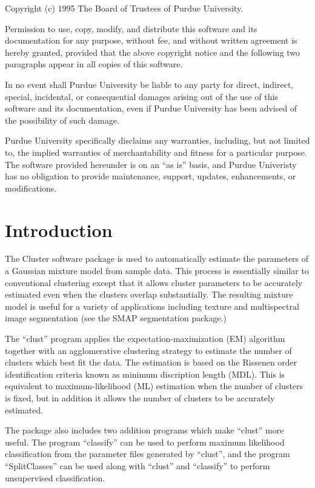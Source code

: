 \documentclass[12pt]{article}
\begin{document}
{\footnotesize
\noindent
Copyright (c) 1995 The Board of Trustees of Purdue University.

Permission to use, copy, modify, and distribute this software and its
documentation for any purpose, without fee, and without written agreement is
hereby granted, provided that the above copyright notice and the following
two paragraphs appear in all copies of this software.

In no event shall Purdue University be liable to any party for direct,
indirect, special, incidental, or consequential damages arising out of the
use of this software and its documentation, even if Purdue University has
been advised of the possibility of such damage.

Purdue University specifically disclaims any warranties, including, but not
limited to, the implied warranties of merchantability and fitness for a
particular purpose.  The software provided hereunder is on an ``as is'' basis,
and Purdue Univeristy has no obligation to provide maintenance, support,
updates, enhancements, or modifications.
}



\newpage
\tableofcontents
\vspace*{\fill}


\newpage
\section{Introduction}

The Cluster software package is used to automatically estimate
the parameters of a Gaussian mixture model from sample
data.
This process is essentially similar to conventional clustering
except that it allows cluster parameters to be 
accurately estimated even when the clusters overlap
substantially.
The resulting mixture model is useful for a variety
of applications including texture and multispectral
image segmentation (see the SMAP segmentation
package.)

The ``clust'' program applies the expectation-maximization
(EM) algorithm together with an agglomerative clustering
strategy to estimate the number of clusters which best
fit the data.
The estimation is based on the Rissenen order
identification criteria known as minimum discription length (MDL).
This is equivalent to maximum-likelihood (ML) estimation when
the number of clusters is fixed, but in addition it allows the number
of clusters to be accurately estimated.

The package also includes two addition programs which make
``clust'' more useful.
The program ``classify'' can be used to perform maximum likelihood
classification from the parameter files generated by ``clust'',
and the program ``SplitClasses'' can be used along with ``clust'' 
and ``classify'' to perform unsupervised classification.
\end{document}
